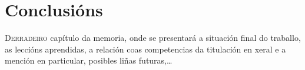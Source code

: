 \chapter{Conclusións}
\label{chap:conclusions}

\lettrine{D}{erradeiro} capítulo da memoria, onde se presentará a
situación final do traballo, as leccións aprendidas, a relación coas
competencias da titulación en xeral e a mención en particular,
posibles liñas futuras,\dots

\Blindtext
